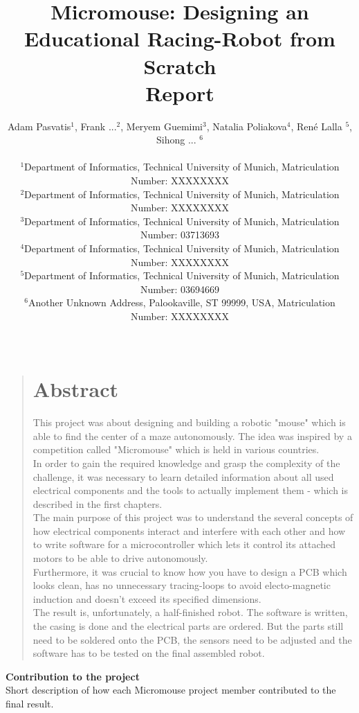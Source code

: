 \documentclass[12pt]{article}
\title{Micromouse: Designing an Educational Racing-Robot from Scratch \\Report}
\author
{Adam Pasvatis$^{1}$, Frank ...$^{2}$, Meryem Guemimi$^{3}$, Natalia Poliakova$^{4}$, René Lalla $^{5}$, Sihong ... $^{6}$\\
\\
\normalsize{$^{1}$Department of Informatics, Technical University of Munich, Matriculation Number: XXXXXXXX}\\
\normalsize{$^{2}$Department of Informatics, Technical University of Munich, Matriculation Number: XXXXXXXX}\\
\normalsize{$^{3}$Department of Informatics, Technical University of Munich, Matriculation Number: 03713693}\\
\normalsize{$^{4}$Department of Informatics, Technical University of Munich, Matriculation Number: XXXXXXXX}\\
\normalsize{$^{5}$Department of Informatics, Technical University of Munich, Matriculation Number: 03694669}\\
\normalsize{$^{6}$Another Unknown Address, Palookaville, ST 99999, USA, Matriculation Number: XXXXXXXX}\\
\\
}
\date{}
\newenvironment{sciabstract}{%
\begin{quote} \bf}
{\end{quote}}
\begin{document}

\baselineskip24pt


\maketitle

\newpage

\begin{sciabstract}
  \section*{Abstract}
    This project was about designing and building a robotic "mouse" which is able to find the center of a maze autonomously. The idea was inspired by a competition called "Micromouse" which is held in various countries.\\
    In order to gain the required knowledge and grasp the complexity of the challenge, it was necessary to learn detailed information about all used electrical components and the tools to actually implement them - which is described in the first chapters.\\
    The main purpose of this project was to understand the several concepts of how electrical components interact and interfere with each other and how to write software for a microcontroller which lets it control its attached motors to be able to drive autonomously.\\
    Furthermore, it was crucial to know how you have to design a PCB which looks clean, has no unnecessary tracing-loops to avoid electo-magnetic induction and doesn't exceed its specified dimensions.\\

    \noindent
    The result is, unfortunately, a half-finished robot. The software is written, the casing is done and the electrical parts are ordered. But the parts still need to be soldered onto the PCB, the sensors need to be adjusted and the software has to be tested on the final assembled robot.\\

\end{sciabstract}

\newpage

\Large \textbf{Contribution to the project}\\

\normalsize Short description of how each Micromouse project member contributed to the final result.
\end{document}
